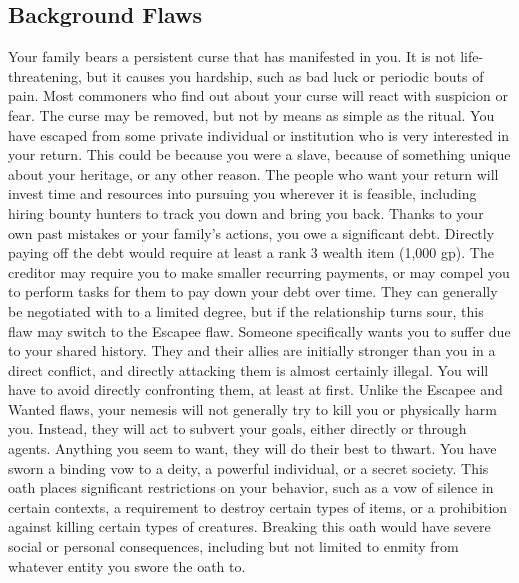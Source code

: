   \subsection{Background Flaws}
     Your family bears a persistent curse that has manifested in you.
    It is not life-threatening, but it causes you hardship, such as bad luck or periodic bouts of pain.
    Most commoners who find out about your curse will react with suspicion or fear.
    The curse may be removed, but not by means as simple as the  ritual.
     You have escaped from some private individual or institution who is very interested in your return.
    This could be because you were a slave, because of something unique about your heritage, or any other reason.
    The people who want your return will invest time and resources into pursuing you wherever it is feasible, including hiring bounty hunters to track you down and bring you back.
     Thanks to your own past mistakes or your family's actions, you owe a significant debt.
    Directly paying off the debt would require at least a rank 3 wealth item (1,000 gp).
    The creditor may require you to make smaller recurring payments, or may compel you to perform tasks for them to pay down your debt over time.
    They can generally be negotiated with to a limited degree, but if the relationship turns sour, this flaw may switch to the Escapee flaw.
     Someone specifically wants you to suffer due to your shared history.
    They and their allies are initially stronger than you in a direct conflict, and directly attacking them is almost certainly illegal.
    You will have to avoid directly confronting them, at least at first.
    Unlike the Escapee and Wanted flaws, your nemesis will not generally try to kill you or physically harm you.
    Instead, they will act to subvert your goals, either directly or through agents.
    Anything you seem to want, they will do their best to thwart.
     You have sworn a binding vow to a deity, a powerful individual, or a secret society.
    This oath places significant restrictions on your behavior, such as a vow of silence in certain contexts, a requirement to destroy certain types of items, or a prohibition against killing certain types of creatures.
    Breaking this oath would have severe social or personal consequences, including but not limited to enmity from whatever entity you swore the oath to.
